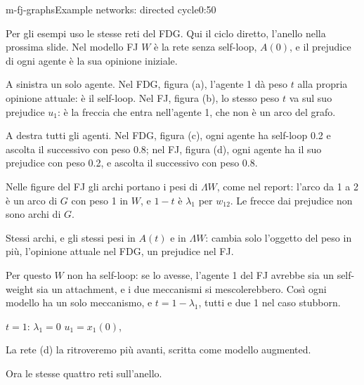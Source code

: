 \begin{slide}{m-fj-graphs}{Example networks: directed cycle}{0:50 {\color{red}}}
  \begin{discorso}
    \item Per gli esempi uso le stesse reti del FDG. Qui il ciclo diretto, l'anello nella prossima slide. Nel modello FJ $W$ è la rete senza self-loop, $A(0)$, e il prejudice di ogni agente è la sua opinione iniziale.
    \item A sinistra un solo agente. Nel FDG, figura (a), l'agente 1 dà peso $t$ alla propria opinione attuale: è il self-loop. Nel FJ, figura (b), lo stesso peso $t$ va sul suo prejudice $u_1$: è la freccia che entra nell'agente 1, che non è un arco del grafo.
    \item A destra tutti gli agenti. Nel FDG, figura (c), ogni agente ha self-loop 0.2 e {\color{red}   } {\color{blue}ascolta il successivo con peso 0.8;} nel FJ, figura (d), ogni agente ha il suo prejudice con peso 0.2, e {\color{red}   } {\color{blue}ascolta il successivo con peso 0.8.}
    \item {\color{blue}Nelle figure del FJ gli archi portano i pesi di $\Lambda W$, come nel report: l'arco da 1 a 2 è un arco di $G$ con peso 1 in $W$, e $1-t$ è $\lambda_1$ per $w_{12}$. Le frecce dai prejudice non sono archi di $G$.}
    \item Stessi archi, {\color{blue}e gli} stessi {\color{red}} {\color{blue}pesi in $A(t)$ e in $\Lambda W$:} cambia solo l'oggetto del peso in più, l'opinione attuale nel FDG, un prejudice nel FJ.
    \item {\color{blue}Per questo $W$ non ha self-loop: se lo avesse, l'agente 1 del FJ avrebbe sia un self-weight sia un attachment, e i due meccanismi si mescolerebbero. Così ogni modello ha un solo meccanismo, e $t=1-\lambda_1$, tutti e due 1 nel caso stubborn.}
    \item {\color{red}               }
    \item {\color{red}  } {\color{red}$t=1$:} {\color{red}       } {\color{red}$\lambda_1=0$} {\color{red}} {\color{red}$u_1=x_1(0)$,} {\color{red}           }
    \item La rete (d) la ritroveremo più avanti, scritta come modello augmented.
    \item Ora le stesse quattro reti sull'anello.
  \end{discorso}
\end{slide}

